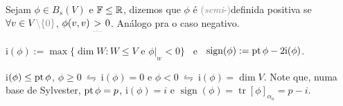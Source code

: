 \begin{definition}
    Sejam \(\phi \in B_s(V)\) e \(\mathbb{F}\leq \mathbb{R}\), dizemos que \(\phi \) é \textcolor{gray}{(\emph{semi}-)}definida positiva se \(\forall v\in V \textcolor{gray}{\setminus \{0\}}\), \(\phi(v,v) \underset{\textcolor{gray}{^{\_\_}}}{>} 0 \). Análogo pra o caso negativo. 
\end{definition}

\begin{definition}
    \centering \(\text{i}(\phi):= \max \{ \dim W: W\leq V \text{ e } \phi|_{_W}<0\}\) \ e \ \(\operatorname{sign}(\phi):= \operatorname{pt} \phi - 2 \text{i}(\phi)\). 
\end{definition}

\begin{note}
    i\((\phi)\leq \operatorname{pt} \phi\), \(\phi \geq 0 \ \leftrightharpoons \ \text{i}(\phi)=0\) e \(\phi < 0\ \leftrightharpoons \ \text{i}(\phi) = \dim V\). Note que, numa base de Sylvester, \(\operatorname{pt}\phi = p\), \(\text{i}(\phi) = i\) e \(\operatorname{sign}(\phi) = \operatorname{tr}[\phi]_{\alpha_o} = p -i\).
\end{note}

